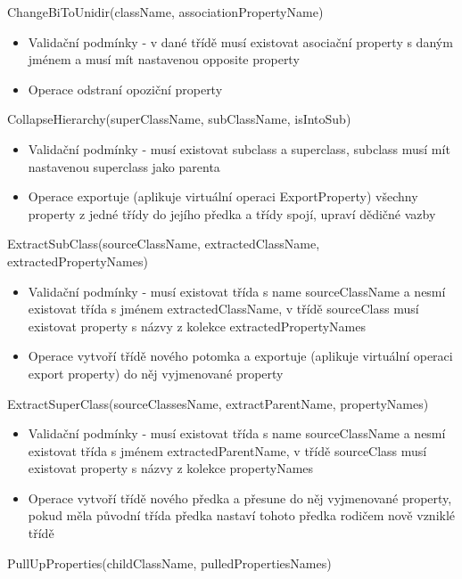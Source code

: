 \documentclass[11pt,twoside,a4paper]{book}
\begin{document}
\begin{list}{Operace :}{}
  \item ChangeBiToUnidir(className, associationPropertyName)
  \begin{itemize}
    \item Validační podmínky - v dané třídě musí existovat asociační property
    s daným jménem a musí mít nastavenou opposite property
    \item Operace odstraní opoziční property
  \end{itemize}
  \item CollapseHierarchy(superClassName, subClassName, isIntoSub)
  \begin{itemize}
    \item Validační podmínky - musí existovat subclass a superclass, subclass
    musí mít nastavenou superclass jako parenta
    \item Operace exportuje (aplikuje virtuální operaci ExportProperty)
    všechny property z jedné třídy do jejího předka a třídy spojí, upraví
    dědičné vazby
  \end{itemize}
  \item ExtractSubClass(sourceClassName, extractedClassName, extractedPropertyNames)
  \begin{itemize}
    \item Validační podmínky - musí existovat třída s name sourceClassName a
    nesmí existovat třída s jménem extractedClassName, v třídě sourceClass musí
    existovat property s názvy z kolekce extractedPropertyNames
    \item Operace vytvoří třídě nového potomka a
    exportuje (aplikuje virtuální operaci export property) do něj vyjmenované
    property
  \end{itemize}
  \item ExtractSuperClass(sourceClassesName, extractParentName, propertyNames)
  \begin{itemize}
    \item Validační podmínky - musí existovat třída s name sourceClassName a
    nesmí existovat třída s jménem extractedParentName, v třídě sourceClass musí
    existovat property s názvy z kolekce propertyNames
    \item Operace vytvoří třídě nového předka a přesune do něj vyjmenované
    property, pokud měla původní třída předka nastaví tohoto předka rodičem 
    nově vzniklé třídě
  \end{itemize}
  \item PullUpProperties(childClassName, pulledPropertiesNames)
  \begin{itemize}

\end{itemize}
\end{list}
\end{document}
